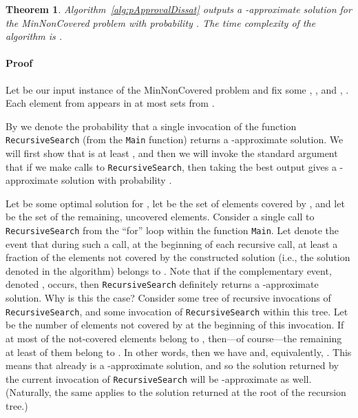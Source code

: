 \documentclass[11pt]{article}
\newtheorem{theorem}{Theorem}
\newenvironment{proof}{\paragraph{Proof}}{\hfill\medskip}
\begin{document}
\begin{theorem}\label{thm:pApprovalDissat}
  Algorithm~\ref{alg:pApprovalDissat} outputs a -approximate
  solution for the MinNonCovered problem with probability . The time complexity of the algorithm is .
\end{theorem}
\begin{proof}
  Let  be our input instance of the MinNonCovered
  problem and fix some , , and , . Each element from  appears in at most  sets
  from .

  By  we denote the probability that a single invocation of the
  function \texttt{RecursiveSearch} (from the \texttt{Main} function)
  returns a -approximate solution.  We will first show that
   is at least , and then
  we will invoke the standard argument that if we make
   calls to
  \texttt{RecursiveSearch}, then taking the best output gives a
  -approximate solution with probability .

  


  Let  be some optimal solution for , let  be the set of elements covered by , and let  be the set of the remaining, uncovered elements.
Consider a single call to \texttt{RecursiveSearch} from the ``for''
  loop within the function \texttt{Main}.  Let  denote the event
  that during such a call, at the beginning of each recursive call, at
  least a  fraction of the elements not covered
  by the constructed solution (i.e., the solution denoted
   in the algorithm) belongs to .
Note that if the complementary event, denoted ,
  occurs, then \texttt{RecursiveSearch} definitely returns a
  -approximate solution. Why is this the case? Consider some
  tree of recursive invocations of \texttt{RecursiveSearch}, and some
  invocation of \texttt{RecursiveSearch} within this tree. Let  be
  the number of elements not covered by  at the beginning
  of this invocation.  If at most  of the
  not-covered elements belong to , then---of course---the
  remaining at least  of them belong to . In
  other words, then we have  and,
  equivalently, . This means that 
  already is a -approximate solution, and so the solution
  returned by the current invocation of \texttt{RecursiveSearch} will
  be -approximate as well.  (Naturally, the same applies to the
  solution returned at the root of the recursion tree.)




\end{proof}
\end{document}
